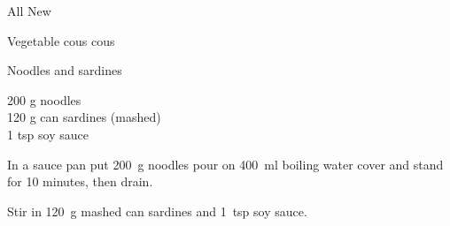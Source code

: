 \begin{menu}{All New}
\begin{recipe}{2}{Vegetable cous cous}
\begin{instructions}
    \end{instructions}
    \end{recipe}%
  
    \begin{recipe}{1}{Noodles and sardines}%
    
		\begin{ingredients}
		200 g noodles  \\
	120 g can sardines (mashed) \\
	1 tsp soy sauce  \\
	
		\end{ingredients}
	
    \begin{instructions}
    \item 
      In a sauce pan
      put
      200~g  noodles
      pour on
      400~ml  boiling water
      cover and stand for 10 minutes, then drain.
    \item 
        Stir in
        120~g mashed can sardines
        and
        1~tsp  soy sauce.
      
    \end{instructions}
    \end{recipe}%
  
    \clearpage
    \end{menu}
	
